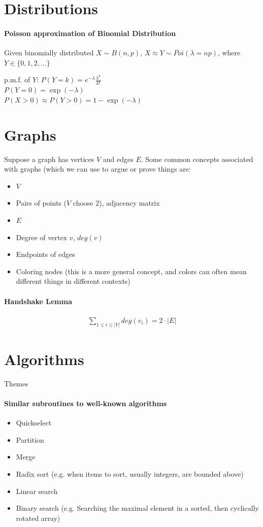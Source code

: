 \documentclass{article}
\begin{document}
\section{Distributions}
\paragraph{Poisson approximation of Binomial Distribution}
Given binomially distributed $X\sim B(n, p)$, $X\approx Y\sim Poi(\lambda = np)$, where $Y\in \{0,1,2,\dots\}$

\begin{center}
	p.m.f. of $Y$: $P(Y=k) = e^{-\lambda}\frac{\lambda^k}{k!}$\\
	$P(Y=0) = \exp(-\lambda)$\\
	$P(X>0) \approx P(Y>0) = 1 - \exp(-\lambda)$
\end{center}


\section{Graphs}
Suppose a graph has vertices $V$ and edges $E$. Some common concepts associated with graphs (which we can use to argue or prove things are:
\begin{itemize}
	\item $V$
	\item Pairs of points ($V$ choose 2), adjacency matrix
	\item $E$
	\item Degree of vertex $v$, $deg(v)$
	\item Endpoints of edges
	\item Coloring nodes (this is a more general concept, and colors can often mean different things in different contexts)
\end{itemize}

\paragraph{Handshake Lemma}
\begin{align*}
	\sum_{1\leq i\leq |V|}deg(v_i) = 2\cdot |E|
\end{align*}

\section{Algorithms}
Themes

\paragraph{Similar subroutines to well-known algorithms}
\begin{itemize}
	\item Quickselect
	\item Partition
	\item Merge
	\item Radix sort (e.g. when items to sort, usually integers, are bounded above)
	\item Linear search
	\item Binary search (e.g. Searching the maximal element in a sorted, then cyclically rotated array)
\end{itemize}
\end{document}
